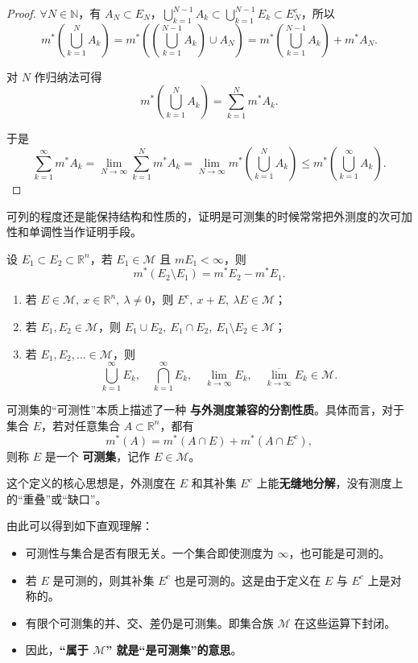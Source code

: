 \documentclass[lang=cn,10pt]{elegantbook}
\begin{document}
\begin{proof}
$\forall N \in \mathbb{N}$，有 $A_N \subset E_N$，$\bigcup_{k=1}^{N-1} A_k \subset \bigcup_{k=1}^{N-1} E_k \subset E_N^c$，所以
\[
m^*\left( \bigcup_{k=1}^{N} A_k \right) = m^*\left( \left( \bigcup_{k=1}^{N-1} A_k \right) \cup A_N \right) = m^*\left( \bigcup_{k=1}^{N-1} A_k \right) + m^* A_N.
\]

对 $N$ 作归纳法可得
\[
m^*\left( \bigcup_{k=1}^{N} A_k \right) = \sum_{k=1}^{N} m^* A_k.
\]

于是
\[
\sum_{k=1}^{\infty} m^* A_k = \lim_{N \to \infty} \sum_{k=1}^{N} m^* A_k = \lim_{N \to \infty} m^*\left( \bigcup_{k=1}^{N} A_k \right) \leq m^*\left( \bigcup_{k=1}^{\infty} A_k \right).
\]
\end{proof}
可列的程度还是能保持结构和性质的，证明是可测集的时候常常把外测度的次可加性和单调性当作证明手段。
\begin{theorem}[可测集的可减性]
设 $E_1 \subset E_2 \subset \mathbb{R}^n$，若 $E_1 \in \mathcal{M}$ 且 $m E_1 < \infty$，则
\[
m^*(E_2 \setminus E_1) = m^* E_2 - m^* E_1.
\]
\end{theorem}
\begin{theorem}[可测对集合运算的封闭性]
\begin{enumerate}
  \item 若 $E \in \mathcal{M},\ x \in \mathbb{R}^n,\ \lambda \neq 0$，则 $E^c,\ x + E,\ \lambda E \in \mathcal{M}$；
  
  \item 若 $E_1, E_2 \in \mathcal{M}$，则 $E_1 \cup E_2,\ E_1 \cap E_2,\ E_1 \setminus E_2 \in \mathcal{M}$；
  
  \item 若 $E_1, E_2, \dots \in \mathcal{M}$，则
  \[
  \bigcup_{k=1}^{\infty} E_k,\quad \bigcap_{k=1}^{\infty} E_k,\quad \lim_{k \to \infty} E_k,\quad \overline{\lim_{k \to \infty}} E_k \in \mathcal{M}.
  \]
\end{enumerate}
\end{theorem}
可测集的“可测性”本质上描述了一种 \textbf{与外测度兼容的分割性质}。具体而言，对于集合 $E$，若对任意集合 $A \subset \mathbb{R}^n$，都有
\[
m^*(A) = m^*(A \cap E) + m^*(A \cap E^c),
\]
则称 $E$ 是一个 \textbf{可测集}，记作 $E \in \mathcal{M}$。

这个定义的核心思想是，外测度在 $E$ 和其补集 $E^c$ 上能\textbf{无缝地分解}，没有测度上的“重叠”或“缺口”。

由此可以得到如下直观理解：
\begin{itemize}
  \item 可测性与集合是否有限无关。一个集合即使测度为 $\infty$，也可能是可测的。
  \item 若 $E$ 是可测的，则其补集 $E^c$ 也是可测的。这是由于定义在 $E$ 与 $E^c$ 上是对称的。
  \item 有限个可测集的并、交、差仍是可测集。即集合族 $\mathcal{M}$ 在这些运算下封闭。
  \item 因此，\textbf{“属于 $\mathcal{M}$” 就是“是可测集”的意思}。
\end{itemize}
\end{document}

